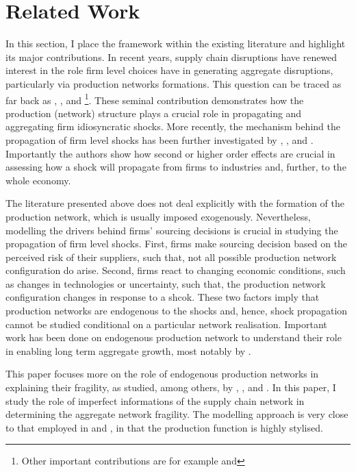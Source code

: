 \documentclass[../../main.tex]{subfiles}
\begin{document}
\section{Related Work}

In this section, I place the framework within the existing literature and highlight its major contributions. In recent years, supply chain disruptions have renewed interest in the role firm level choices have in generating aggregate disruptions, particularly via production networks formations. This question can be traced as far back as , , and \footnote{Other important contributions are for example  and }. These seminal contribution demonstrates how the production (network) structure plays a crucial role in propagating and aggregating firm idiosyncratic shocks. More recently, the mechanism behind the propagation of firm level shocks has been further investigated by , , and . Importantly the authors show how second or higher order effects are crucial in assessing how a shock will propagate from firms to industries and, further, to the whole economy. 

The literature presented above does not deal explicitly with the formation of the production network, which is usually imposed exogenously. Nevertheless, modelling the drivers behind firms' sourcing decisions is crucial in studying the propagation of firm level shocks. First, firms make sourcing decision based on the perceived risk of their suppliers, such that, not all possible production network configuration do arise. Second, firms react to changing economic conditions, such as changes in technologies or uncertainty, such that, the production network configuration changes in response to a shcok. These two factors imply that production networks are endogenous to the shocks and, hence, shock propagation cannot be studied conditional on a particular network realisation. Important work has been done on endogenous production network to understand their role in enabling long term aggregate growth, most notably by . 

This paper focuses more on the role of endogenous production networks in explaining their fragility, as studied, among others, by , , and . In this paper, I study the role of imperfect informations of the supply chain network in determining the aggregate network fragility. The modelling approach is very close to that employed in  and , in that the production function is highly stylised. 
\end{document}
